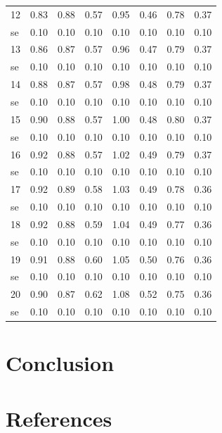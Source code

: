 \documentclass[11pt,preprint, authoryear]{elsarticle}
\numberwithin{equation}{section}
\numberwithin{figure}{section}
\numberwithin{table}{section}
\begin{document}
\begin{longtable}{lrrrrrrr}
  12 & 0.83 & 0.88 & 0.57 & 0.95 & 0.46 & 0.78 & 0.37 \\ 
  se & 0.10 & 0.10 & 0.10 & 0.10 & 0.10 & 0.10 & 0.10 \\ 
  13 & 0.86 & 0.87 & 0.57 & 0.96 & 0.47 & 0.79 & 0.37 \\ 
  se & 0.10 & 0.10 & 0.10 & 0.10 & 0.10 & 0.10 & 0.10 \\ 
  14 & 0.88 & 0.87 & 0.57 & 0.98 & 0.48 & 0.79 & 0.37 \\ 
  se & 0.10 & 0.10 & 0.10 & 0.10 & 0.10 & 0.10 & 0.10 \\ 
  15 & 0.90 & 0.88 & 0.57 & 1.00 & 0.48 & 0.80 & 0.37 \\ 
  se & 0.10 & 0.10 & 0.10 & 0.10 & 0.10 & 0.10 & 0.10 \\ 
  16 & 0.92 & 0.88 & 0.57 & 1.02 & 0.49 & 0.79 & 0.37 \\ 
  se & 0.10 & 0.10 & 0.10 & 0.10 & 0.10 & 0.10 & 0.10 \\ 
  17 & 0.92 & 0.89 & 0.58 & 1.03 & 0.49 & 0.78 & 0.36 \\ 
  se & 0.10 & 0.10 & 0.10 & 0.10 & 0.10 & 0.10 & 0.10 \\ 
  18 & 0.92 & 0.88 & 0.59 & 1.04 & 0.49 & 0.77 & 0.36 \\ 
  se & 0.10 & 0.10 & 0.10 & 0.10 & 0.10 & 0.10 & 0.10 \\ 
  19 & 0.91 & 0.88 & 0.60 & 1.05 & 0.50 & 0.76 & 0.36 \\ 
  se & 0.10 & 0.10 & 0.10 & 0.10 & 0.10 & 0.10 & 0.10 \\ 
  20 & 0.90 & 0.87 & 0.62 & 1.08 & 0.52 & 0.75 & 0.36 \\ 
  se & 0.10 & 0.10 & 0.10 & 0.10 & 0.10 & 0.10 & 0.10 \\ 
   \bottomrule
\end{longtable}
\endgroup

\hypertarget{conclusion}{%
\section{Conclusion}\label{conclusion}}

\newpage

\hypertarget{references}{%
\section*{References}\label{references}}
\end{document}

